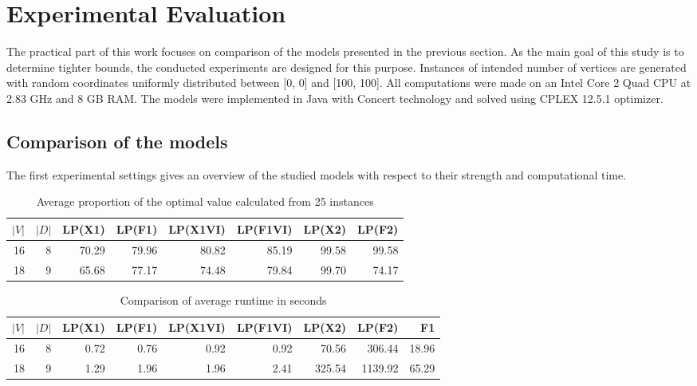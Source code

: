 \section{Experimental Evaluation}
\label{sec:exp}

The practical part of this work focuses on comparison of the models presented in the previous section.
As the main goal of this study is to determine tighter bounds, the conducted experiments are designed for this purpose.
Instances of intended number of vertices are generated with random coordinates uniformly distributed between [0, 0] and [100, 100].
All computations were made on an Intel Core 2 Quad CPU at 2.83 GHz and 8 GB RAM.
The models were implemented in Java with Concert technology and solved using CPLEX 12.5.1 optimizer.
 
\subsection{Comparison of the models}

The first experimental settings gives an overview of the studied models with respect to their strength and computational time.

\begin{table}[h!]
\centering
\setlength{\tabcolsep}{6pt} %
\renewcommand{\arraystretch}{1.4} %
\begin{tabular}{rrrrrrrr}
 $|V|$ & $|D|$ & LP(X1) & LP(F1) & LP(X1VI) & LP(F1VI) & LP(X2) & LP(F2) \\ \hline
  16 & 8       & 70.29  & 79.96  & 80.82    & 85.19    & 99.58  & 99.58\\
  18 & 9       & 65.68  & 77.17  & 74.48    & 79.84    & 99.70  & 74.17\\ 
\end{tabular}
\caption{Average proportion of the optimal value calculated from 25 instances}
\label{tab:small_inst_cost}
\end{table}

\begin{table}[h!]
\centering
\setlength{\tabcolsep}{6pt} %
\renewcommand{\arraystretch}{1.4} %
\begin{tabular}{rrrrrrrrr}
 $|V|$ & $|D|$ & LP(X1) & LP(F1) & LP(X1VI) & LP(F1VI) & LP(X2) & LP(F2)  & F1\\ \hline
  16 & 8       & 0.72   & 0.76   & 0.92     & 0.92     & 70.56  & 306.44  & 18.96 \\
  18 & 9       & 1.29   & 1.96   & 1.96     & 2.41     & 325.54 & 1139.92 & 65.29\\ 
\end{tabular}
\caption{Comparison of average runtime in seconds}
\label{tab:small_inst_time}
\end{table}


